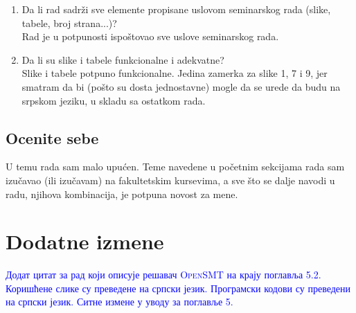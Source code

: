 \documentclass[a4paper]{report}
\newcommand{\odgovor}[1]{\textcolor{blue}{#1}}
\begin{document}
\begin{enumerate}
{Vrlo uredna struktura rada. Nakon početnih sekcija koje čitaoca upoznaju sa podtemama prelazi se na glavnu temu koja objedinjuje prethodni sadržaj.}
\item Da li rad sadrži sve elemente propisane uslovom seminarskog rada (slike, tabele, broj strana...)?\\
{Rad je u potpunosti ispoštovao sve uslove seminarskog rada.}
\item Da li su slike i tabele funkcionalne i adekvatne?\\
{Slike i tabele potpuno funkcionalne. Jedina zamerka za slike 1, 7 i 9, jer smatram da bi (pošto su dosta jednostavne) mogle da se urede da budu na srpskom jeziku, u skladu sa ostatkom rada.}
\end{enumerate}

\section{Ocenite sebe}
U temu rada sam malo upućen. Teme navedene u početnim sekcijama rada sam izučavao (ili izučavam) na fakultetskim kursevima, a sve što se dalje navodi u radu, njihova kombinacija, je potpuna novost za mene.

\chapter{Dodatne izmene}
\odgovor{Додат цитат за рад који описује решавач \textsc{OpenSMT} на крају поглавља 5.2.}
\odgovor{Коришћене слике су преведене на српски језик. Програмски кодови су преведени на српски језик.}
\odgovor{Ситне измене у уводу за поглавље 5.}
\end{document}
